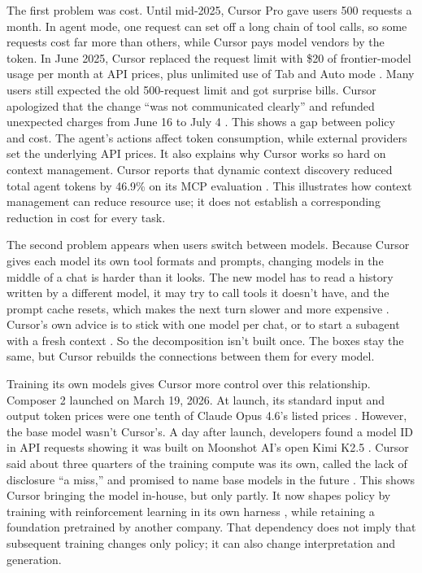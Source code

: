 \documentclass[11pt]{article}
\begin{document}
The first problem was cost. Until mid-2025, Cursor Pro gave users 500 requests a month. In agent mode, one request can set off a long chain of tool calls, so some requests cost far more than others, while Cursor pays model vendors by the token. In June 2025, Cursor replaced the request limit with \$20 of frontier-model usage per month at API prices, plus unlimited use of Tab and Auto mode \citep{cursor2025pricing}. Many users still expected the old 500-request limit and got surprise bills. Cursor apologized that the change ``was not communicated clearly'' and refunded unexpected charges from June 16 to July 4 \citep{cursor2025pricing}. This shows a gap between policy and cost. The agent's actions affect token consumption, while external providers set the underlying API prices. It also explains why Cursor works so hard on context management. Cursor reports that dynamic context discovery reduced total agent tokens by 46.9\% on its MCP evaluation \citep{katz2026dynamic}. This illustrates how context management can reduce resource use; it does not establish a corresponding reduction in cost for every task.

The second problem appears when users switch between models. Because Cursor gives each model its own tool formats and prompts, changing models in the middle of a chat is harder than it looks. The new model has to read a history written by a different model, it may try to call tools it doesn't have, and the prompt cache resets, which makes the next turn slower and more expensive \citep{heule2026harness}. Cursor's own advice is to stick with one model per chat, or to start a subagent with a fresh context \citep{heule2026harness}. So the decomposition isn't built once. The boxes stay the same, but Cursor rebuilds the connections between them for every model.

Training its own models gives Cursor more control over this relationship. Composer 2 launched on March 19, 2026. At launch, its standard input and output token prices were one tenth of Claude Opus 4.6's listed prices \citep{datacamp2026composer2}. However, the base model wasn't Cursor's. A day after launch, developers found a model ID in API requests showing it was built on Moonshot AI's open Kimi K2.5 \citep{datacamp2026composer2}. Cursor said about three quarters of the training compute was its own, called the lack of disclosure ``a miss,'' and promised to name base models in the future \citep{datacamp2026composer2}. This shows Cursor bringing the model in-house, but only partly. It now shapes policy by training with reinforcement learning in its own harness \citep{cursor2025composer}, while retaining a foundation pretrained by another company. That dependency does not imply that subsequent training changes only policy; it can also change interpretation and generation.
\end{document}
